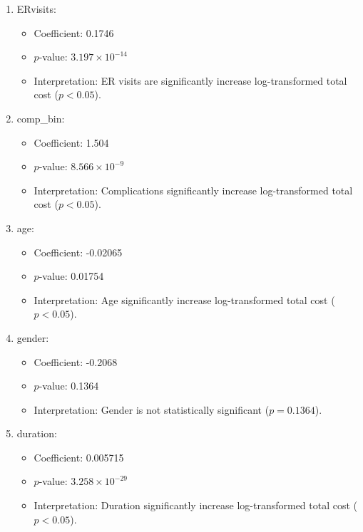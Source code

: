 \documentclass[
]{article}
\begin{document}
\begin{enumerate}
\def\labelenumi{\arabic{enumi}.}
\item
  ERvisits:

  \begin{itemize}
  \item
    Coefficient: 0.1746
  \item
    \(p\)-value: \ensuremath{3.197\times 10^{-14}}
  \item
    Interpretation: ER visits are significantly increase log-transformed
    total cost (\(p < 0.05\)).
  \end{itemize}
\item
  comp\_bin:

  \begin{itemize}
  \item
    Coefficient: 1.504
  \item
    \(p\)-value: \ensuremath{8.566\times 10^{-9}}
  \item
    Interpretation: Complications significantly increase log-transformed
    total cost (\(p < 0.05\)).
  \end{itemize}
\item
  age:

  \begin{itemize}
  \item
    Coefficient: -0.02065
  \item
    \(p\)-value: 0.01754
  \item
    Interpretation: Age significantly increase log-transformed total
    cost (\(p < 0.05\)).
  \end{itemize}
\item
  gender:

  \begin{itemize}
  \item
    Coefficient: -0.2068
  \item
    \(p\)-value: 0.1364
  \item
    Interpretation: Gender is not statistically significant
    (\(p = 0.1364\)).
  \end{itemize}
\item
  duration:

  \begin{itemize}
  \item
    Coefficient: 0.005715
  \item
    \(p\)-value: \ensuremath{3.258\times 10^{-29}}
  \item
    Interpretation: Duration significantly increase log-transformed
    total cost (\(p < 0.05\)).
  \end{itemize}
\end{enumerate}
\end{document}
